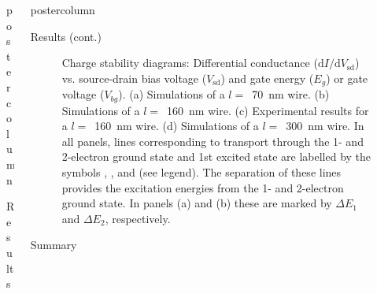 \documentclass[xelatex,final,hyperref={pdfpagelabels=true,setpagesize=false,colorlinks=false},xcolor={usenames,dvipsnames,svgnames},notheorems]{beamer}
\newlength{\columnheight}
\begin{document}
\begin{frame}
\begin{columns}
\begin{column}{.32\textwidth}
\begin{beamercolorbox}[center,wd=\textwidth]{postercolumn}
\begin{minipage}[T]{.95\textwidth}
{\begin{block}{Results\phantom{Gg}}
\begin{itemize}
\begin{itemize}
                \end{itemize}
              \end{itemize}
            \end{block}
          }
        \end{minipage}
      \end{beamercolorbox}
    \end{column}


    \begin{column}{.32\textwidth}
      \begin{beamercolorbox}[center,wd=\textwidth]{postercolumn}
        \begin{minipage}[T]{.95\textwidth} %
          \parbox[t][\columnheight]{\textwidth}{ %
            \begin{block}{Results (cont.)\phantom{Gg}}
              \begin{figure}
                \caption{Charge stability diagrams: Differential conductance ($\mathrm dI/\mathrm dV_\text{sd}$) vs. source-drain bias voltage ($V_\text{sd}$) and gate energy ($E_g$) or gate voltage ($V_{bg}$). \linebreak
                (a) Simulations of a $l=$~70~nm wire. (b) Simulations of a $l=$~160~nm wire. (c) Experimental results for a  $l=$~160~nm wire. (d) Simulations of a $l=$~300~nm wire. In all panels, lines corresponding to transport through the 1- and 2-electron ground state and 1st excited state are labelled by the symbols , ,  and  (see legend). The separation of these lines provides the excitation energies from the 1- and 2-electron ground state. In panels (a) and (b) these are marked by $\Delta E_1$ and $\Delta E_2$, respectively.}
                \label{fig:cond}
              \end{figure}
            \end{block}
            \vfill
            \begin{exampleblock}{Summary\phantom{Gg}}

\end{exampleblock}}
\end{minipage}
\end{beamercolorbox}
\end{column}
\end{columns}
\end{frame}
\end{document}
